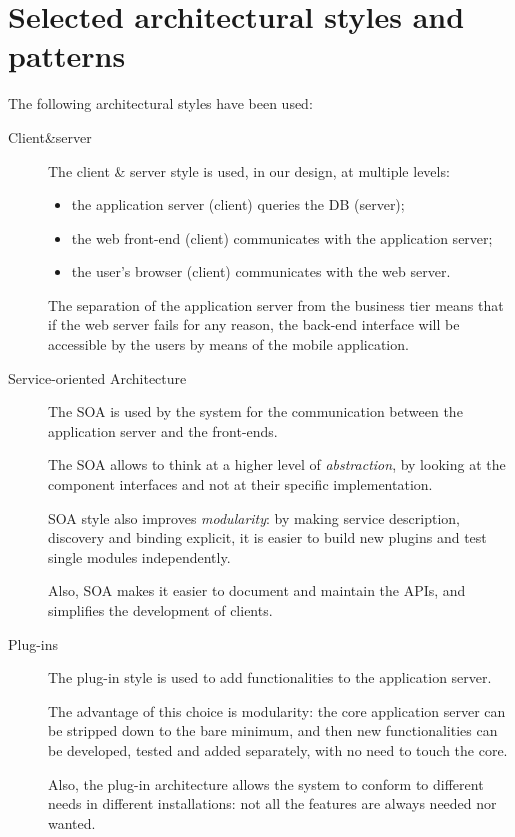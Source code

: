 \section{Selected architectural styles and patterns}
\label{sec:styles-patterns}

The following architectural styles have been used:

\begin{description}
\item[Client\&server]
The client \& server style is used, in our design, at multiple levels:
\begin{itemize}
    \item the application server (client) queries the DB (server);
    \item the web front-end (client) communicates with the application server;
    \item the user's browser (client) communicates with the web server.
\end{itemize}

The separation of the application server from the business tier means that if the web server fails for any reason, the back-end interface will be accessible by the users by means of the mobile application.

\item[Service-oriented Architecture]
The SOA is used by the system for the communication between the application server and the front-ends.

The SOA allows to think at a higher level of \emph{abstraction}, by looking at the component interfaces and not at their specific implementation.

SOA style also improves \emph{modularity}: by making service description, discovery and binding explicit, it is easier to build new plugins and test single modules independently.

Also, SOA makes it easier to document and maintain the APIs, and simplifies the development of clients.

\item[Plug-ins]
The plug-in style is used to add functionalities to the application server.

The advantage of this choice is modularity: the core application server can be stripped down to the bare minimum, and then new functionalities can be developed, tested and added separately, with no need to touch the core.

Also, the plug-in architecture allows the system to conform to different needs in different installations: not all the features are always needed nor wanted.


\end{description}
